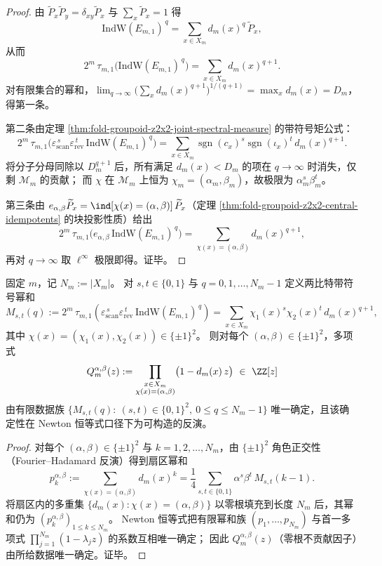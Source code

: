 \begin{proof}
由 \(\widetilde P_x\widetilde P_y=\delta_{xy}\widetilde P_x\) 与 \(\sum_x\widetilde P_x=1\) 得
\[
\mathrm{IndW}(E_{m,1})^{\,q}=\sum_{x\in X_m} d_m(x)^{q}\,\widetilde P_x,
\]
从而
\[
2^m\,\tau_{m,1}\!\bigl(\mathrm{IndW}(E_{m,1})^{\,q}\bigr)
=
\sum_{x\in X_m}d_m(x)^{q+1}.
\]
对有限集合的幂和，\(\lim_{q\to\infty}\bigl(\sum_x d_m(x)^{q+1}\bigr)^{1/(q+1)}=\max_x d_m(x)=D_m\)，得第一条。
\par
第二条由定理 \ref{thm:fold-groupoid-z2x2-joint-spectral-measure} 的带符号矩公式：
\[
2^m\,\tau_{m,1}\!\bigl(\varepsilon_{\mathrm{scan}}^{\,s}\varepsilon_{\mathrm{rev}}^{\,t}\,\mathrm{IndW}(E_{m,1})^{\,q}\bigr)
=
\sum_{x\in X_m}\operatorname{sgn}(c_x)^s\operatorname{sgn}(\iota_x)^t\,d_m(x)^{q+1}.
\]
将分子分母同除以 \(D_m^{q+1}\) 后，所有满足 \(d_m(x)<D_m\) 的项在 \(q\to\infty\) 时消失，仅剩 \(\mathcal M_m\) 的贡献；
而 \(\chi\) 在 \(\mathcal M_m\) 上恒为 \(\chi_m=(\alpha_m,\beta_m)\)，故极限为 \(\alpha_m^s\beta_m^t\)。
\par
第三条由 \(e_{\alpha,\beta}\widetilde P_x=\ind[\chi(x)=(\alpha,\beta)]\,\widetilde P_x\)（定理 \ref{thm:fold-groupoid-z2x2-central-idempotents} 的块投影性质）给出
\[
2^m\,\tau_{m,1}\!\bigl(e_{\alpha,\beta}\,\mathrm{IndW}(E_{m,1})^{\,q}\bigr)
=
\sum_{\chi(x)=(\alpha,\beta)} d_m(x)^{q+1},
\]
再对 \(q\to\infty\) 取 \(\ell^\infty\) 极限即得。证毕。
\end{proof}

\begin{proposition}\label{prop:fold-chi-layered-fiber-spectrum-certified-by-signed-powersums}
固定 \(m\)，记 \(N_m:=|X_m|\)。
对 \(s,t\in\{0,1\}\) 与 \(q=0,1,\dots,N_m-1\) 定义两比特带符号幂和
\[
M_{s,t}(q)
:=
2^m\,\tau_{m,1}\!\left(\varepsilon_{\mathrm{scan}}^{\,s}\varepsilon_{\mathrm{rev}}^{\,t}\,\mathrm{IndW}(E_{m,1})^{\,q}\right)
=
\sum_{x\in X_m}\chi_1(x)^s\chi_2(x)^t\,d_m(x)^{q+1},
\]
其中 \(\chi(x)=(\chi_1(x),\chi_2(x))\in\{\pm1\}^2\)。
则对每个 \((\alpha,\beta)\in\{\pm1\}^2\)，多项式
\[
Q_m^{\alpha,\beta}(z):=
\prod_{\substack{x\in X_m\\ \chi(x)=(\alpha,\beta)}}\bigl(1-d_m(x)\,z\bigr)\ \in\ \ZZ[z]
\]
由有限数据族
\(
\{M_{s,t}(q):\ (s,t)\in\{0,1\}^2,\ 0\le q\le N_m-1\}
\)
唯一确定，且该确定性在 Newton 恒等式口径下为可构造的反演。
\end{proposition}
\begin{proof}
对每个 \((\alpha,\beta)\in\{\pm1\}^2\) 与 \(k=1,2,\dots,N_m\)，由 \(\{\pm1\}^2\) 角色正交性（Fourier--Hadamard 反演）得到扇区幂和
\[
p_k^{\alpha,\beta}
:=
\sum_{\chi(x)=(\alpha,\beta)} d_m(x)^k
=
\frac14\sum_{s,t\in\{0,1\}}\alpha^s\beta^t\,M_{s,t}(k-1).
\]
将扇区内的多重集 \(\{d_m(x):\chi(x)=(\alpha,\beta)\}\) 以零根填充到长度 \(N_m\) 后，其幂和仍为 \((p_k^{\alpha,\beta})_{1\le k\le N_m}\)。
Newton 恒等式把有限幂和族 \((p_1,\dots,p_{N_m})\) 与首一多项式
\(
\prod_{j=1}^{N_m}(1-\lambda_j z)
\)
的系数互相唯一确定；
因此 \(Q_m^{\alpha,\beta}(z)\)（零根不贡献因子）由所给数据唯一确定。证毕。
\end{proof}

